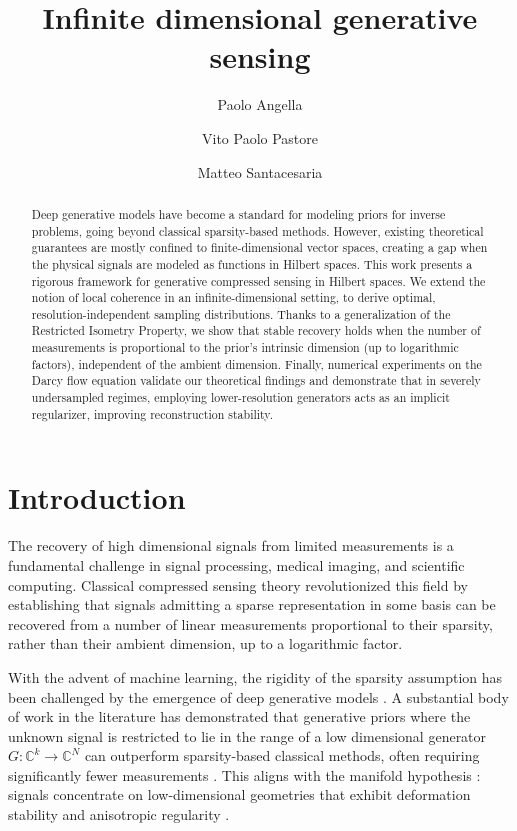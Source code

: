 \documentclass[a4paper,oneside]{amsart}
\title{Infinite dimensional generative sensing}
\author{Paolo Angella}
\author{Vito Paolo Pastore}
\author{Matteo Santacesaria}
\begin{document}

\begin{abstract}
Deep generative models have become a standard for modeling priors for inverse problems, going beyond classical sparsity-based methods. However, existing theoretical guarantees are mostly confined to finite-dimensional vector spaces, creating a gap when the physical signals are modeled as functions in Hilbert spaces. This work presents a rigorous framework for generative compressed sensing in Hilbert spaces. We extend the notion of local coherence in an infinite-dimensional setting, to derive optimal, resolution-independent sampling distributions. Thanks to a generalization of the Restricted Isometry Property, we show that stable recovery holds when the number of measurements is proportional to the prior's intrinsic dimension (up to logarithmic factors), independent of the ambient dimension. Finally, numerical experiments on the Darcy flow equation validate our theoretical findings and demonstrate that in severely undersampled regimes, employing lower-resolution generators acts as an implicit regularizer, improving reconstruction stability.
\end{abstract}

\maketitle





\section{Introduction}
The recovery of high dimensional signals from limited measurements is a fundamental challenge in signal processing, medical imaging, and scientific computing. Classical compressed sensing theory \cite{candes2006robust, donoho2006compressed} revolutionized this field by establishing that signals admitting a sparse representation in some basis can be recovered from a number of linear measurements proportional to their sparsity, rather than their ambient dimension, up to a logarithmic factor.

With the advent of machine learning, the rigidity of the sparsity assumption has been challenged by the emergence of deep generative models \cite{kingma2013auto, goodfellow2014generative, sohl2015deep}.
A substantial body of work in the literature has demonstrated that generative priors where the unknown signal is restricted to lie in the range of a low dimensional generator $G\colon \mathbb{C}^k \to \mathbb{C}^N$ can outperform sparsity-based classical methods, often requiring significantly fewer measurements \cite{pmlr-v70-bora17a,9943805,Berk22, berk2023model,adcock2023unified}. This aligns with the manifold hypothesis \cite{fefferman2016testing}: signals concentrate on low-dimensional geometries that exhibit deformation stability and anisotropic regularity \cite{mallat2012group, grohs2014parabolic}.
\end{document}
